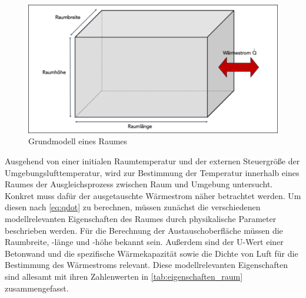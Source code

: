 \begin{figure}
\centering
\includegraphics[width=\textwidth]{abbildungen/20160316_grundraum}
\caption{Grundmodell eines Raumes}
\label{fig:grundraum}
\end{figure}

Ausgehend von einer initialen Raumtemperatur und der externen Steuergröße der Umgebungslufttemperatur, wird zur Bestimmung der Temperatur innerhalb eines Raumes der Ausgleichsprozess zwischen Raum und Umgebung untersucht. Konkret muss dafür der ausgetauschte Wärmestrom näher betrachtet werden. Um diesen nach \ref{eq:qdot} zu berechnen, müssen zunächst die verschiedenen modellrelevanten Eigenschaften des Raumes durch physikalische Parameter beschrieben werden. Für die Berechnung der Austauschoberfläche müssen die Raumbreite, -länge und -höhe bekannt sein. Außerdem sind der U-Wert einer Betonwand und die spezifische Wärmekapazität sowie die Dichte von Luft für die Bestimmung des Wärmestroms relevant.
Diese modellrelevanten Eigenschaften sind allesamt mit ihren Zahlenwerten in \ref{tab:eigenschaften_raum} zusammengefasst.

